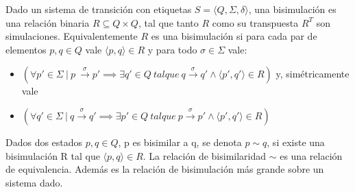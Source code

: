 \begin{definition}[Bisimulación]
Dado un sistema de transición con etiquetas $ S =\langle Q, \Sigma, \delta \rangle $, una bisimulación es una relación binaria $R \subseteq Q \times Q$, tal que tanto $R$ como su transpuesta $R^T$ son simulaciones. Equivalentemente $R$ es una bisimulación si para cada par de elementos $p, q \in Q$ vale $\langle p, q \rangle \in R$ y para todo $\sigma \in \Sigma $ vale:
\begin{itemize}
    \item $(\forall p' \in \Sigma \  | \  p \ \overset{\sigma}{\rightarrow} p' \implies \exists q'\in Q \ \mathit{tal que} \ q \overset{\sigma}{\rightarrow} q' \land \langle p', q' \rangle \in R )$ y, simétricamente vale 
    \item $(\forall q' \in \Sigma \  | \  q \overset{\sigma}{\rightarrow} q' \implies \exists p'\in Q \ \mathit{tal que} \ p \overset{\sigma}{\rightarrow} p' \land \langle p', q' \rangle \in R ) $
\end{itemize}

Dados dos estados $p, q \in Q $, p es bisimilar a q, se denota $p \sim q $, si existe una bisimulación R tal que $\langle p,q \rangle \in R$. La relación de bisimilaridad $\sim$ es una relación de equivalencia. Además es la relación de bisimulación más grande sobre un sistema dado.

\end{definition}
